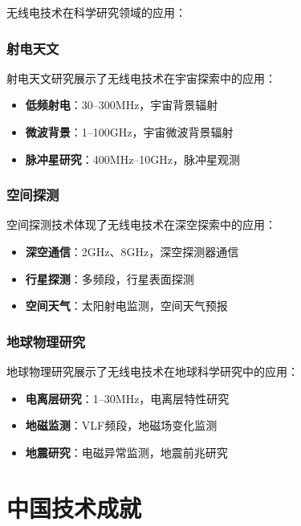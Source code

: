 \documentclass[12pt,UTF8]{ctexbook}
\begin{document}
无线电技术在科学研究领域的应用：

\subsection{射电天文}

射电天文研究展示了无线电技术在宇宙探索中的应用：

\begin{itemize}[leftmargin=3.5em]
    \item \textbf{低频射电}：30--300MHz，宇宙背景辐射
    \item \textbf{微波背景}：1--100GHz，宇宙微波背景辐射
    \item \textbf{脉冲星研究}：400MHz--10GHz，脉冲星观测
\end{itemize}

\subsection{空间探测}

空间探测技术体现了无线电技术在深空探索中的应用：

\begin{itemize}[leftmargin=3.5em]
    \item \textbf{深空通信}：2GHz、8GHz，深空探测器通信
    \item \textbf{行星探测}：多频段，行星表面探测
    \item \textbf{空间天气}：太阳射电监测，空间天气预报
\end{itemize}

\subsection{地球物理研究}

地球物理研究展示了无线电技术在地球科学研究中的应用：

\begin{itemize}[leftmargin=3.5em]
    \item \textbf{电离层研究}：1--30MHz，电离层特性研究
    \item \textbf{地磁监测}：VLF频段，地磁场变化监测
    \item \textbf{地震研究}：电磁异常监测，地震前兆研究
\end{itemize}

\chapter{中国技术成就}
\end{document}
